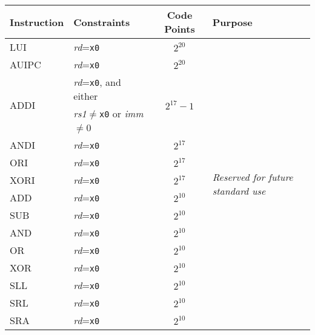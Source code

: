 \begin{table}[hbt]
\centering
\begin{tabular}{|l|l|c|l|}
  \hline
  Instruction           & Constraints                                 & Code Points & Purpose \\ \hline \hline
  LUI                   & {\em rd}={\tt x0}                           & $2^{20}$                    & \multirow{25}{*}{\em Reserved for future standard use} \\ \cline{1-3}
  AUIPC                 & {\em rd}={\tt x0}                           & $2^{20}$                    & \\ \cline{1-3}
  \multirow{2}{*}{ADDI} & {\em rd}={\tt x0}, and either               & \multirow{2}{*}{$2^{17}-1$} & \\
                        & {\em rs1}$\neq${\tt x0} or {\em imm}$\neq$0 &                             & \\ \cline{1-3}
  ANDI                  & {\em rd}={\tt x0}                           & $2^{17}$                    & \\ \cline{1-3}
  ORI                   & {\em rd}={\tt x0}                           & $2^{17}$                    & \\ \cline{1-3}
  XORI                  & {\em rd}={\tt x0}                           & $2^{17}$                    & \\ \cline{1-3}
  ADD                   & {\em rd}={\tt x0}                           & $2^{10}$                    & \\ \cline{1-3}
  SUB                   & {\em rd}={\tt x0}                           & $2^{10}$                    & \\ \cline{1-3}
  AND                   & {\em rd}={\tt x0}                           & $2^{10}$                    & \\ \cline{1-3}
  OR                    & {\em rd}={\tt x0}                           & $2^{10}$                    & \\ \cline{1-3}
  XOR                   & {\em rd}={\tt x0}                           & $2^{10}$                    & \\ \cline{1-3}
  SLL                   & {\em rd}={\tt x0}                           & $2^{10}$                    & \\ \cline{1-3}
  SRL                   & {\em rd}={\tt x0}                           & $2^{10}$                    & \\ \cline{1-3}
  SRA                   & {\em rd}={\tt x0}                           & $2^{10}$                    & \\ \cline{1-3}

\end{tabular}
\end{table}
